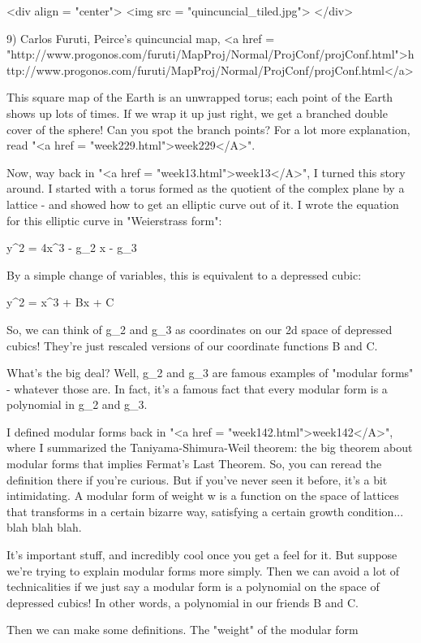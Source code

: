 <div align = "center">
<img src = "quincuncial_tiled.jpg">
</div>

9) Carlos Furuti, Peirce's quincuncial map, 
<a href = "http://www.progonos.com/furuti/MapProj/Normal/ProjConf/projConf.html">http://www.progonos.com/furuti/MapProj/Normal/ProjConf/projConf.html</a>

This square map of the Earth is an unwrapped torus; each point of the
Earth shows up lots of times.  If we wrap it up just right, we get a
branched double cover of the sphere!  Can you spot the branch points?
For a lot more explanation, read "<a href =
"week229.html">week229</A>".

Now, way back in "<a href = "week13.html">week13</A>", I turned this story around.  I started with 
a torus formed as the quotient of the complex plane by a lattice -
and showed how to get an elliptic curve out of it.  I wrote the 
equation for this elliptic curve in "Weierstrass form":

y^{2} = 4x^{3} - g_{2} x - g_{3}

By a simple change of variables, this is equivalent to a depressed 
cubic:

y^{2} = x^{3} + Bx + C

So, we can think of g_{2} and g_{3} as coordinates on
our 2d space of depressed cubics!  They're just rescaled versions of
our coordinate functions B and C.

What's the big deal?  Well, g_{2} and g_{3} are famous
examples of "modular forms" - whatever those are.  In fact,
it's a famous fact that every modular form is a polynomial in
g_{2} and g_{3}.

I defined modular forms back in "<a href = "week142.html">week142</A>", where I summarized the
Taniyama-Shimura-Weil theorem: the big theorem about modular forms
that implies Fermat's Last Theorem.  So, you can reread the definition
there if you're curious.  But if you've never seen it before, it's
a bit intimidating.  A modular form of weight w is a function on the 
space of lattices that transforms in a certain bizarre way, satisfying a 
certain growth condition... blah blah blah.

It's important stuff, and incredibly cool once you get a feel for it.
But suppose we're trying to explain modular forms more simply.
Then we can avoid a lot of technicalities if we just say 
a modular form is a polynomial on the space of depressed cubics!  In 
other words, a polynomial in our friends B and C.  

Then we can make some definitions.  The "weight" of the modular form

